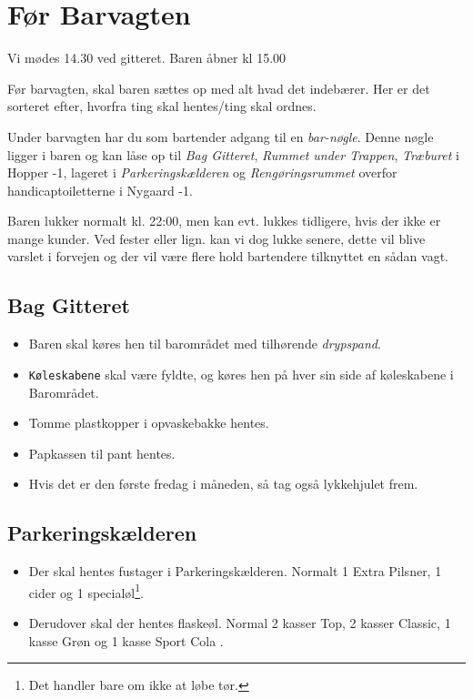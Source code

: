 \section{Før Barvagten}
\label{sec:pre-barvagten}

Vi mødes 14.30 ved gitteret. Baren åbner kl 15.00

Før barvagten, skal baren sættes op med alt hvad det indebærer. Her er
det sorteret efter, hvorfra ting skal hentes/ting skal ordnes.

Under barvagten har du som bartender adgang til en \textit{bar-nøgle}. 
Denne nøgle ligger i baren og kan låse op til \textit{Bag Gitteret}, 
\textit{Rummet under Trappen}, \textit{Træburet} i Hopper -1, 
lageret i \textit{Parkeringskælderen} og 
\textit{Rengøringsrummet} overfor handicaptoiletterne i Nygaard -1.

Baren lukker normalt kl. 22:00, men kan evt. lukkes tidligere, hvis der ikke er mange kunder.
Ved fester eller lign. kan vi dog lukke senere, dette vil blive varslet i forvejen og der vil 
være flere hold bartendere tilknyttet en sådan vagt.

\subsection{Bag Gitteret}
\label{sec:pre:bag-ved-gitteret}

\begin{itemize}
	\item Baren skal køres hen til barområdet med tilhørende \textit{drypspand}.
	\item \texttt{Køleskabene} skal være fyldte, og køres hen på hver sin side af køleskabene i 
	Barområdet.
	\item Tomme plastkopper i opvaskebakke hentes.
	\item Papkassen til pant hentes.
	\item Hvis det er den første fredag i måneden, så tag også lykkehjulet frem.
\end{itemize}

\subsection{Parkeringskælderen}
\label{sec:pre:hopper}

\begin{itemize}
	\item Der skal hentes fustager i Parkeringskælderen. Normalt 1
	Extra Pilsner, 1 cider og 1 specialøl\footnote[1]{\label{note1}Det handler bare om ikke at løbe
	tør.}.
	\item Derudover skal der hentes flaskeøl. Normal 2 kasser Top, 2 kasser Classic, 
	1 kasse Grøn og 1 kasse Sport Cola \footnotemark[1].
\end{itemize}

